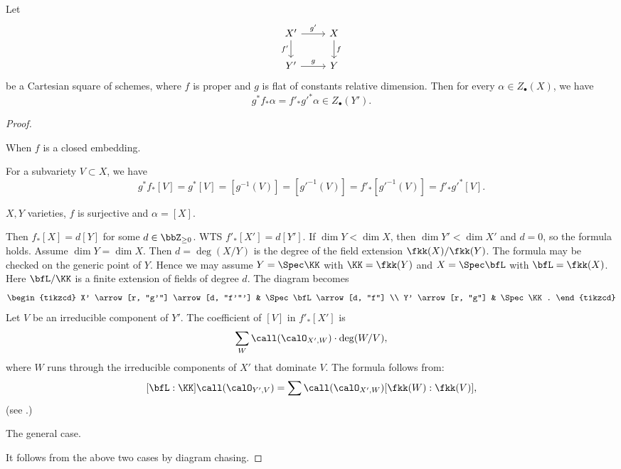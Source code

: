     \begin{proposition}
        Let 
        \[ \begin{tikzcd}
            X' \arrow[r, "g'"] \arrow[d, "f'"'] & X \arrow[d, "f"] \\
            Y' \arrow[r, "g"] & Y
        \end{tikzcd} \]
        be a Cartesian square of schemes, where \(f\) is proper and \(g\) is flat of constants relative dimension.
        Then for every \(\alpha \in Z_\bullet(X)\), we have
        \[ g^*f_*\alpha = f'_*g'^*\alpha \in Z_\bullet(Y'). \]
    \end{proposition}
    \begin{proof}
        \hspace{1em}
        \begin{case}
            When \(f\) is a closed embedding.
        \end{case}

        For a subvariety \(V \subset X\), we have
        \[ g^*f_*[V] = g^*[V] = [g^{-1}(V)] = [g'^{-1}(V)] = f'_*[g'^{-1}(V)] = f'_*g'^*[V]. \]

        \begin{case}
            \(X,Y\) varieties, \(f\) is surjective and \(\alpha = [X]\).
        \end{case}

        Then \(f_*[X] = d [Y]\) for some \(d \in \bbZ_{\geq 0}\).
        WTS \(f'_*[X'] = d [Y']\).
        If \(\dim Y < \dim X\), then \(\dim Y' < \dim X'\) and \(d = 0\), so the formula holds.
        Assume \(\dim Y = \dim X\).
        Then \(d = \deg(X/Y)\) is the degree of the field extension \(\fkk(X)/\fkk(Y)\).
        The formula may be checked on the generic point of \(Y\).
        Hence we may assume \(Y = \Spec \KK\) with \(\KK = \fkk(Y)\) and \(X = \Spec \bfL\) with \(\bfL = \fkk(X)\).
        Here \(\bfL/\KK\) is a finite extension of fields of degree \(d\).
        The diagram becomes
        \[ \begin{tikzcd}
            X' \arrow[r, "g'"] \arrow[d, "f'"'] & \Spec \bfL \arrow[d, "f"] \\
            Y' \arrow[r, "g"] & \Spec \KK.
        \end{tikzcd} \]
        Let \(V\) be an irreducible component of \(Y'\).
        The coefficient of \([V]\) in \(f'_*[X']\) is
        \[ \sum_{W} \call(\calO_{X',W})\cdot\deg(W/V), \]
        where \(W\) runs through the irreducible components of \(X'\) that dominate \(V\).
        The formula follows from:
        \[ [\bfL: \KK] \call(\calO_{Y',V}) = \sum \call(\calO_{X',W}) [\fkk(W) : \fkk(V)], \]
        (see \cite[A.1.3]{Fulton13Intersection}.)

        \begin{case}
            The general case.
        \end{case}

        It follows from the above two cases by diagram chasing.

    \end{proof}


